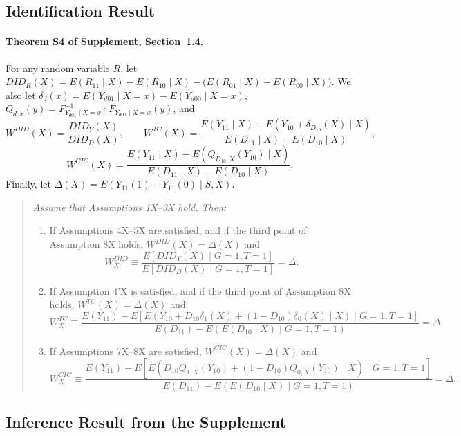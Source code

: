 \subsection{Identification Result}\label{sec:app_cdh_thm}

\paragraph{Theorem S4 of \citet{fuzzy2018} Supplement, Section~1.4.}\label{thm:cdh_s4}
For any random variable $R$, let $DID_R(X)=E(R_{11}\mid X)-E(R_{10}\mid X)-\bigl(E(R_{01}\mid X)-E(R_{00}\mid X)\bigr)$. We also let $\delta_d(x)=E(Y_{d01}\mid X=x)-E(Y_{d00}\mid X=x)$, $Q_{d,x}(y)=F^{-1}_{Y_{d01}\mid X=x}\circ F_{Y_{d00}\mid X=x}(y)$, and
\[
W^{DID}(X)=\frac{DID_Y(X)}{DID_D(X)}, \qquad
W^{TC}(X)=\frac{E(Y_{11}\mid X)-E(Y_{10}+ \delta_{D_{10}}(X)\mid X)}{E(D_{11}\mid X)-E(D_{10}\mid X)},
\]
\[
W^{CIC}(X)=\frac{E(Y_{11}\mid X)-E(Q_{D_{10},X}(Y_{10})\mid X)}{E(D_{11}\mid X)-E(D_{10}\mid X)}.
\]
Finally, let $\Delta(X)=E(Y_{11}(1)-Y_{11}(0)\mid S, X)$.

\begin{quote}\itshape
Assume that Assumptions 1X--3X hold. Then:
\begin{enumerate}
\item If Assumptions 4X--5X are satisfied, and if the third point of Assumption 8X holds, $W^{DID}(X)=\Delta(X)$ and
\[
W_X^{DID} \equiv \frac{E[DID_Y(X)\mid G = 1, T = 1]}{E[DID_D(X)\mid G = 1, T = 1]} = \Delta.
\]
\item If Assumption 4'X is satisfied, and if the third point of Assumption 8X holds, $W^{TC}(X)=\Delta(X)$ and
\[
W_X^{TC} \equiv \frac{E(Y_{11}) - E[E(Y_{10} + D_{10}\delta_1(X) + (1-D_{10})\delta_0(X)\mid X)\mid G = 1, T = 1]}{E(D_{11}) - E(E(D_{10}\mid X)\mid G = 1, T = 1)} = \Delta.
\]
\item If Assumptions 7X--8X are satisfied, $W^{CIC}(X)=\Delta(X)$ and
\[
W_X^{CIC} \equiv \frac{E(Y_{11}) - E[E(D_{10}Q_{1,X}(Y_{10}) + (1-D_{10})Q_{0,X}(Y_{10})\mid X)\mid G = 1, T = 1]}{E(D_{11}) - E(E(D_{10}\mid X)\mid G = 1, T = 1)} = \Delta.
\]
\end{enumerate}
\end{quote}

\subsection{Inference Result from the Supplement}

